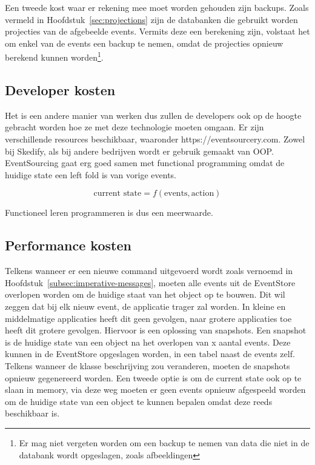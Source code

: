 Een tweede kost waar er rekening mee moet worden gehouden zijn backups. Zoals vermeld in Hoofdstuk~\ref{sec:projections} zijn de databanken die gebruikt worden projecties van de afgebeelde events. Vermits deze een berekening zijn, volstaat het om enkel van de events een backup te nemen, omdat de projecties opnieuw berekend kunnen worden\footnote{Er mag niet vergeten worden om een backup te nemen van data die niet in de databank wordt opgeslagen, zoals afbeeldingen}.

\subsection{Developer kosten}
\label{subsec:developer-kosten}

Het is een andere manier van werken dus zullen de developers ook op de hoogte gebracht worden hoe ze met deze technologie moeten omgaan. Er zijn verschillende resources beschikbaar, waaronder https://eventsourcery.com. Zowel bij Skedify, als bij andere bedrijven wordt er gebruik gemaakt van \gls{OOP}. EventSourcing gaat erg goed samen met functional programming omdat de huidige state een \gls{left fold} is van vorige events.

\begin{equation}
\text{current state} = f(\text{events}, \text{action})
\end{equation}

Functioneel leren programmeren is dus een meerwaarde.

\subsection{Performance kosten}
\label{subsec:performance-kosten}

Telkens wanneer er een nieuwe command uitgevoerd wordt zoals vernoemd in Hoofdstuk~\ref{subsec:imperative-messages}, moeten alle events uit de EventStore overlopen worden om de huidige staat van het object op te bouwen. Dit wil zeggen dat bij elk nieuw event, de applicatie trager zal worden. In kleine en middelmatige applicaties heeft dit geen gevolgen, naar grotere applicaties toe heeft dit grotere gevolgen. Hiervoor is een oplossing van snapshots. Een snapshot is de huidige state van een object na het overlopen van x aantal events. Deze kunnen in de EventStore opgeslagen worden, in een tabel naast de events zelf. Telkens wanneer de klasse beschrijving zou veranderen, moeten de snapshots opnieuw gegenereerd worden. Een tweede optie is om de current state ook op te slaan in memory, via deze weg moeten er geen events opnieuw afgespeeld worden om de huidige state van een object te kunnen bepalen omdat deze reeds beschikbaar is.